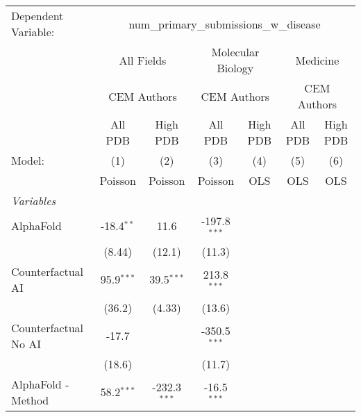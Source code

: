 \begingroup
\centering
\begin{tabular}{lcccccc}
   \tabularnewline \midrule \midrule
   Dependent Variable: & \multicolumn{6}{c}{num\_primary\_submissions\_w\_disease}\\
 & \multicolumn{2}{c}{All Fields} & \multicolumn{2}{c}{Molecular Biology} & \multicolumn{2}{c}{Medicine} \\
\cmidrule(lr){2-3} \cmidrule(lr){4-5} \cmidrule(lr){6-7}
 & \multicolumn{2}{c}{CEM Authors} & \multicolumn{2}{c}{CEM Authors} & \multicolumn{2}{c}{CEM Authors} \\
\cmidrule(lr){2-3} \cmidrule(lr){4-5} \cmidrule(lr){6-7}
 & \multicolumn{1}{c}{All PDB} & \multicolumn{1}{c}{High PDB} & \multicolumn{1}{c}{All PDB} & \multicolumn{1}{c}{High PDB} & \multicolumn{1}{c}{All PDB} & \multicolumn{1}{c}{High PDB} \\
\cmidrule(lr){2-2} \cmidrule(lr){3-3} \cmidrule(lr){4-4} \cmidrule(lr){5-5} \cmidrule(lr){6-6} \cmidrule(lr){7-7}
   Model:                                                     & (1)          & (2)            & (3)            & (4)  & (5)  & (6)\\  
                                                              &  Poisson     & Poisson        & Poisson        & OLS  & OLS  & OLS\\  
   \midrule
   \emph{Variables}\\
   AlphaFold                                                  & -18.4$^{**}$ & 11.6           & -197.8$^{***}$ &      &      &   \\   
                                                              & (8.44)       & (12.1)         & (11.3)         &      &      &   \\   
   Counterfactual AI                                          & 95.9$^{***}$ & 39.5$^{***}$   & 213.8$^{***}$  &      &      &   \\   
                                                              & (36.2)       & (4.33)         & (13.6)         &      &      &   \\   
   Counterfactual No AI                                       & -17.7        &                & -350.5$^{***}$ &      &      &   \\   
                                                              & (18.6)       &                & (11.7)         &      &      &   \\   
   AlphaFold - Method                                         & 58.2$^{***}$ & -232.3$^{***}$ & -16.5$^{***}$  &      &      &   \\   

\end{tabular}
